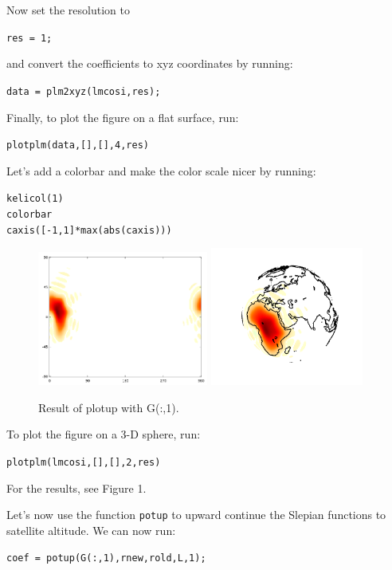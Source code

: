 \documentclass[11pt]{article}
\begin{document}
Now set the resolution to 

\verb+res = 1;+ 

and convert the coefficients to xyz coordinates by running:

\verb+data = plm2xyz(lmcosi,res);+

Finally, to plot the figure on a flat surface, run:

\verb+plotplm(data,[],[],4,res)+

Let's add a colorbar and make the color scale nicer by running:

\verb+kelicol(1)+\\
\verb+colorbar+\\
\verb+caxis([-1,1]*max(abs(caxis)))+

\begin{figure}
  \includegraphics[width=0.5\textwidth]{figures/potupflat.png}
  \includegraphics[width=0.45\textwidth]{figures/potup.png}
  \caption{Result of plotup with G(:,1).}
\label{G(:,1)potup}
\end{figure}

To plot the figure on a 3-D sphere, run:

\verb+plotplm(lmcosi,[],[],2,res)+

For the results, see Figure 1.

Let's now use the function \verb+potup+ to upward continue the Slepian functions to satellite altitude.  We can now run:

\verb+coef = potup(G(:,1),rnew,rold,L,1);+
\end{document}
